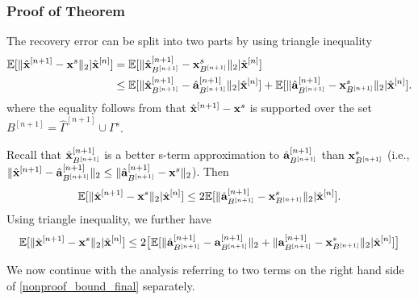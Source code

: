 \documentclass{article}
\begin{document}
\subsubsection{Proof of Theorem}
The recovery error can be split into two parts by using triangle inequality
\begin{equation}\label{main_theorem}
\begin{split}
   \mathbb{E}[ \|\hat{{\bf x}}^{[n+1]} - {\bf x}^s \|_2 | \hat{{\bf x}}^{[n]}] &= \mathbb{E}[\|\hat{{\bf x}}_{B^{[n+1]}}^{[n+1]} - {\bf x}_{B^{[n+1]}}^s \|_2| \hat{{\bf x}}^{[n]}] \\
    &\leq \mathbb{E}[\|\hat{{\bf x}}_{B^{[n+1]}}^{[n+1]} - \hat{{\bf a}}_{B^{[n+1]}}^{[n+1]} \|_2| \hat{{\bf x}}^{[n]}] + \mathbb{E}[\|\hat{{\bf a}}_{B^{[n+1]}}^{[n+1]} - {\bf x}_{B^{[n+1]}}^s \|_2| \hat{{\bf x}}^{[n]}].
    \end{split}
\end{equation}
where the equality follows from that $\hat{{\bf x}}^{[n+1]} - {\bf x}^s$ is supported over the set $B^{[n+1]} = \hat{\Gamma}^{[n+1]} \cup \Gamma^s$.

Recall that $\hat{{\bf x}}_{B^{[n+1]}}^{[n+1]}$ is a better s-term approximation to $\hat{{\bf a}}_{B^{[n+1]}}^{[n+1]}$ than ${\bf x}_{B^{[n+1]}}^{*}$ (i.e., $\|\hat{{\bf x}}^{[n+1]} - \hat{{\bf a}}_{B^{[n+1]}}^{[n+1]} \|_2\leq \| \hat{{\bf a}}_{B^{[n+1]}}^{[n+1]} - {\bf x}^s \|_2$). Then 
\begin{equation}
    \mathbb{E}[\|\hat{{\bf x}}^{[n+1]} - {\bf x}^s \|_2| \hat{{\bf x}}^{[n]}] \leq 2\mathbb{E}[ \|\hat{{\bf a}}_{B^{[n+1]}}^{[n+1]} - {\bf x}_{B^{[n+1]}}^s \|_2 | \hat{{\bf x}}^{[n]}].
\end{equation}
Using triangle inequality, we further have
\begin{equation}\label{nonproof_bound_final}
    \mathbb{E}[\|\hat{{\bf x}}^{[n+1]} - {\bf x}^s \|_2| \hat{{\bf x}}^{[n]}]\leq 2 \big [\mathbb{E}[\|\hat{{\bf a}}_{B^{[n+1]}}^{[n+1]} - {{\bf a}}_{B^{[n+1]}}^{[n+1]} \|_2  + \|{{\bf a}}_{B^{[n+1]}}^{[n+1]} - {{\bf x}}_{B^{[n+1]}}^{*} \|_2 | \hat{{\bf x}}^{[n]}]\big ]
\end{equation}

We now continue with the analysis referring to two terms on the right hand side of \ref{nonproof_bound_final} separately.\\
\end{document}
